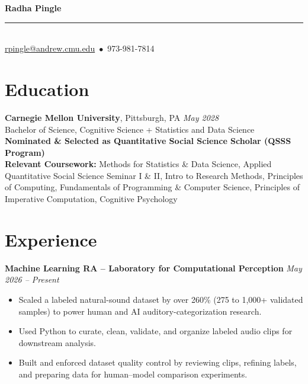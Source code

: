 \documentclass[10.5pt]{article}
\makeatletter
\renewcommand{\maketitle}{
  \begin{center}
    {\LARGE \textbf{Radha Pingle}}\\[0.3em]
    \rule{0.5\textwidth}{0.4pt}\\[0.4em]
    \href{mailto:rpingle@andrew.cmu.edu}{rpingle@andrew.cmu.edu} \,$\bullet$\, 973-981-7814
  \end{center}
  \vspace{-1.0em}
}
\makeatother
\begin{document}
\maketitle

\vspace{-0.5em}
\section{Education}
\textbf{Carnegie Mellon University}, Pittsburgh, PA \hfill \textit{May 2028} \\
Bachelor of Science, Cognitive Science + Statistics and Data
Science\\ 
\textbf{Nominated \& Selected as Quantitative Social Science Scholar (QSSS Program)} \\[0.7em]
\textbf{Relevant Coursework:} Methods for Statistics \& Data Science, Applied Quantitative Social Science Seminar I \& II, Intro to Research Methods, Principles of Computing, Fundamentals of Programming \& Computer Science, Principles of Imperative Computation, Cognitive Psychology


\section{Experience}

\noindent\textbf{Machine Learning RA – Laboratory for Computational Perception} \hfill 
\textit{May 2026 – Present}\\[-1.3em]
\begin{itemize}
  \item Scaled a labeled natural-sound dataset by over 260\% (275 to 1,000+ validated samples) to power human and AI auditory-categorization research.
  \item Used Python to curate, clean, validate, and organize labeled audio clips for downstream analysis.
  \item Built and enforced dataset quality control by reviewing clips, refining labels, and preparing data for human--model comparison experiments.
\end{itemize}
\end{document}
